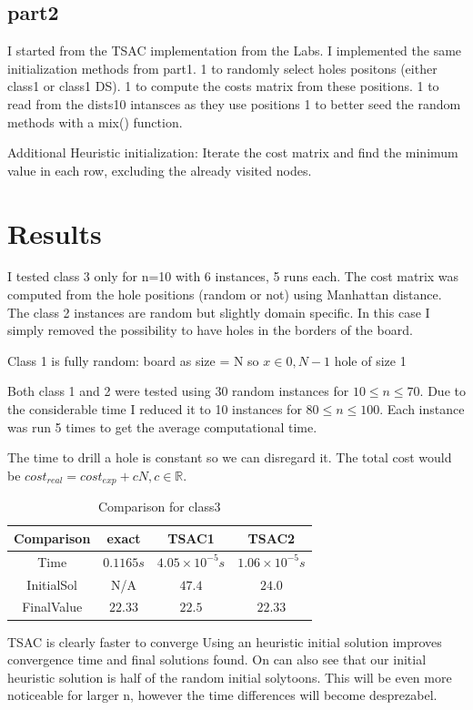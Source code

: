 \documentclass[a4paper, 11pt]{article}
\begin{document}
			
			
			
			
			
		\subsection{part2}

			I started from the TSAC implementation from the Labs.
			I implemented the same initialization methods from part1.
			1 to randomly select holes positons (either class1 or class1 DS).
			1 to compute the costs matrix from these positions.
			1 to read from the dists10 intansces as they use positions
			1 to better seed the random methods with a mix() function.
			
			Additional Heuristic initialization:
				Iterate the cost matrix and find the minimum value in each row, excluding the already visited nodes.
						
	
	\section{Results}
		I tested class 3 only for n=10 with 6 instances, 5 runs each.
		The cost matrix was computed from the hole positions (random or not) using Manhattan distance.
		The class 2 instances are random but slightly domain specific.
		In this case I simply removed the possibility to have holes in the borders of the board.
		
		Class 1 is fully random:
		board as size = N
		so $ x \in {0,N-1}$
		hole of size 1
		
		Both class 1 and 2 were tested using 30 random instances for $ 10 \le n \le 70 $.
		Due to the considerable time I reduced it to 10 instances for $ 80 \le n \le 100 $.
		Each instance was run 5 times to get the average computational time.
		
		The time to drill a hole is constant so we can disregard it.
		The total cost would be $ cost_{real}  = cost_{exp} + cN, c\in \mathbb{R}$.
		
		\begin{table}[H]
			\centering
			\begin{tabular}{c|c|c|c}
				\textbf{Comparison}& \textbf{exact} & \textbf{TSAC1}  			& \textbf{TSAC2}  \\ \hline
				Time			& $ 0.1165 s $ 		& $ 4.05 \times 10^{-5} s $ 	& $ 1.06 \times 10^{-5} s $ \\ \hline
				InitialSol		& N/A		 		& $ 47.4 $ 						& $ 24.0 $ \\ \hline 
				FinalValue		& $ 22.33 $	 		& $ 22.5 $ 						& $ 22.33 $ \\  
			\end{tabular}
			\caption{Comparison for class3}
			\label{table:times3}
		\end{table}
		TSAC is clearly faster to converge
		Using an heuristic initial solution improves convergence time and final solutions found.
		On can also see that our initial heuristic solution is half of the random initial solytoons.
		This will be even more noticeable for larger n, however the time differences will become desprezabel.
		
\end{document}
